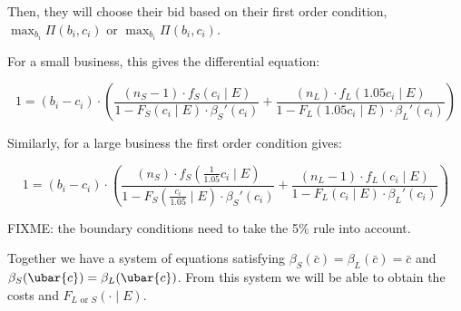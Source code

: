 Then, they will choose their bid based on their first order condition,
\(\max_{b_i} \Pi(b_i, c_i)\) or \(\max_{b_i} \Pi(b_i, c_i)\).

For a small business, this gives the differential equation:


\[
  1 = (b_i - c_i) \cdot \left(
    \frac{(n_S - 1) \cdot f_S(c_i \mid E)}{1 - F_S(c_i \mid E) \cdot \beta_S'(c_i)} +
    \frac{(n_L) \cdot f_L(1.05 c_i \mid E)}{1 - F_L(1.05 c_i \mid E) \cdot \beta_L'(c_i)} \right)
\]

Similarly, for a large business the first order condition gives:

\[
  1 = (b_i - c_i) \cdot \left(
    \frac{(n_S) \cdot f_S(\frac{1}{1.05} c_i \mid E)}{1 - F_S(\frac{c_i}{1.05} \mid E) \cdot \beta_S'(c_i)} +
    \frac{(n_L - 1) \cdot f_L(c_i \mid E)}{1 - F_L(c_i \mid E) \cdot \beta_L'(c_i)} \right)
\]

FIXME: the boundary conditions need to take the 5\% rule into account.

Together we have a system of equations satisfying
\(\beta_S (\bar{c}) = \beta_L (\bar{c}) = \bar{c}\) and
\( \beta_S( \ubar{c} ) = \beta_L( \ubar{c} )\).
From this system we will be able to obtain the costs and
\(F_{L \text{ or } S}(\cdot \mid E)\).

\setlength{\parindent}{1.5em}
